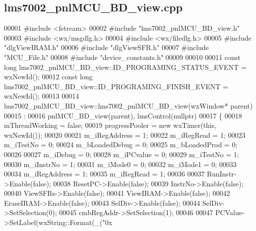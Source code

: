 \subsection{lms7002\+\_\+pnl\+M\+C\+U\+\_\+\+B\+D\+\_\+view.\+cpp}
\label{lms7002__pnlMCU__BD__view_8cpp_source}

\begin{DoxyCode}
00001 \textcolor{preprocessor}{#include <fstream>}
00002 \textcolor{preprocessor}{#include "lms7002_pnlMCU_BD_view.h"}
00003 \textcolor{preprocessor}{#include <wx/msgdlg.h>}
00004 \textcolor{preprocessor}{#include <wx/filedlg.h>}
00005 \textcolor{preprocessor}{#include "dlgViewIRAM.h"}
00006 \textcolor{preprocessor}{#include "dlgViewSFR.h"}
00007 \textcolor{preprocessor}{#include "MCU_File.h"}
00008 \textcolor{preprocessor}{#include "device_constants.h"}
00009 
00010 
00011 \textcolor{keyword}{const} \textcolor{keywordtype}{long} lms7002_pnlMCU_BD_view::ID_PROGRAMING_STATUS_EVENT = wxNewId();
00012 \textcolor{keyword}{const} \textcolor{keywordtype}{long} lms7002_pnlMCU_BD_view::ID_PROGRAMING_FINISH_EVENT = wxNewId();
00013 
00014 lms7002_pnlMCU_BD_view::lms7002_pnlMCU_BD_view(wxWindow* parent)
00015     :
00016     pnlMCU_BD_view(parent), lmsControl(nullptr)
00017 \{
00018     mThreadWorking = \textcolor{keyword}{false};
00019     progressPooler = \textcolor{keyword}{new} wxTimer(\textcolor{keyword}{this}, wxNewId());
00020 
00021     m_iRegAddress = 1;
00022     m_iRegRead = 1;
00023     m_iTestNo = 0;
00024     m_bLoadedDebug = 0;
00025     m_bLoadedProd = 0;
00026 
00027     m_iDebug = 0;
00028     m_iPCvalue = 0;
00029     m_iTestNo = 1;
00030     m_iInstrNo = 1;
00031     m_iMode0 = 0;
00032     m_iMode1 = 0;
00033 
00034     m_iRegAddress = 1;
00035     m_iRegRead = 1;
00036 
00037     RunInstr->Enable(\textcolor{keyword}{false});
00038     ResetPC->Enable(\textcolor{keyword}{false});
00039     InstrNo->Enable(\textcolor{keyword}{false});
00040     ViewSFRs->Enable(\textcolor{keyword}{false});
00041     ViewIRAM->Enable(\textcolor{keyword}{false});
00042     EraseIRAM->Enable(\textcolor{keyword}{false});
00043     SelDiv->Enable(\textcolor{keyword}{false});
00044     SelDiv->SetSelection(0);
00045     cmbRegAddr->SetSelection(1);
00046 
00047     PCValue->SetLabel(wxString::Format(\_(\textcolor{stringliteral}{"0x%
}
\end{DoxyCode}
